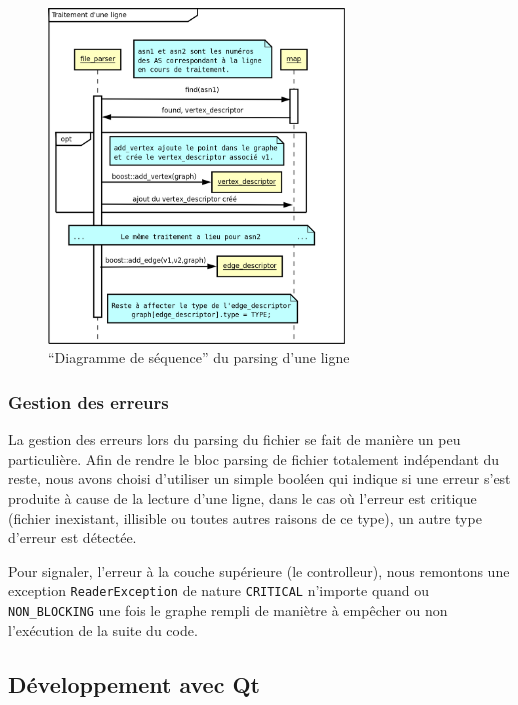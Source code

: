 \begin{figure}[H]
\begin{center}
        \includegraphics[width=0.7\textwidth]{./schema/file_parser2.png}
\caption{``Diagramme de séquence'' du parsing d'une ligne }
\label{file_parser}
\end{center}
\end{figure}

\subsubsection{Gestion des erreurs}

La gestion des erreurs lors du parsing du fichier se fait de manière un peu particulière. Afin de rendre le bloc parsing de fichier totalement indépendant du reste, nous avons choisi d'utiliser un simple booléen qui indique si une erreur s'est produite à cause de la lecture d'une ligne, dans le cas où l'erreur est critique (fichier inexistant, illisible ou toutes autres raisons de ce type), un autre type d'erreur est détectée. 

Pour signaler, l'erreur à la couche supérieure (le controlleur), nous remontons une exception \verb|ReaderException| de nature \verb|CRITICAL| n'importe quand ou \verb|NON_BLOCKING| une fois le graphe rempli de maniètre à empêcher ou non l'exécution de la suite du code.


\subsection{D\'eveloppement avec Qt}

